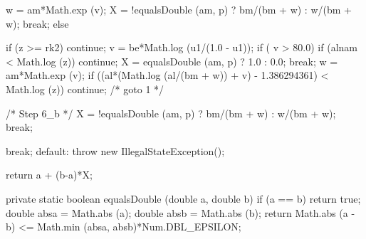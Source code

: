 \begin{code}
\begin{hide}
{{{{{                  w = am*Math.exp (v);
                  X = !equalsDouble (am, p) ? bm/(bm + w) : w/(bm + w);
                  break;
               }
               else {
                  if (z >= rk2)
                     continue;
                  v = be*Math.log (u1/(1.0 - u1));
                  if ( v > 80.0) {
                     if (alnam < Math.log (z))
                        continue;
                     X = equalsDouble (am, p) ? 1.0 : 0.0;
                     break;
                  }
                  w = am*Math.exp (v);
                  if ((al*(Math.log (al/(bm + w)) + v) - 1.386294361) < 
                                                                Math.log (z))
                     continue;  /* goto 1 */

                  /* Step 6_b */
                  X = !equalsDouble (am, p) ? bm/(bm + w) : w/(bm + w);
                  break;
               }
            }
         }
         break;
      default:
         throw new IllegalStateException();
      }

      return a + (b-a)*X;
   }

   private static boolean equalsDouble (double a, double b) {
      if (a == b)
         return true;
      double absa = Math.abs (a);
      double absb = Math.abs (b);
      return Math.abs (a - b) <= Math.min (absa, absb)*Num.DBL_EPSILON;
   }

\end{hide}\end{code}



